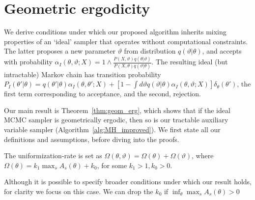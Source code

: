 \vspace{-.1in}
\section{Geometric ergodicity}
\vspace{-.05in}
We derive conditions under which our proposed algorithm
inherits mixing properties of an `ideal' sampler that operates without
computational constraints. The latter proposes a new parameter $\vartheta$
from distribution $q(\vartheta|\theta)$, and accepts with probability
$\alpha_I(\theta,\vartheta; X) = 1 \wedge \frac{P(X , \vartheta)q(\theta| \vartheta)}
{P(X , \theta)q(\vartheta|\theta)}$.  The resulting ideal (but intractable)
Markov chain has transition probability
$P_I(\theta'|\theta) = q(\theta'|\theta)\alpha_I(\theta,\theta';X) + \left[1-\int d\vartheta
q(\vartheta|\theta)\alpha_I(\theta,\vartheta;X)\right]\delta_\theta(\theta')$, the first
term corresponding to acceptance, and the second, rejection.

Our main result is Theorem~\ref{thm:geom_erg}, which shows that if the ideal MCMC
sampler is geometrically ergodic, then so is our tractable auxiliary
variable sampler (Algorithm~\ref{alg:MH_improved}). 
We first state all our definitions and assumptions, before diving into the 
proofs.
\begin{assumption}
The uniformization-rate is set as $\Omega(\theta, \vartheta) = \Omega(\theta) + 
\Omega(\vartheta)$, where %
$\Omega(\theta) = k_1 \max_s A_{s}(\theta) + k_0$, for some 
$k_1 > 1, k_0 > 0$.
\label{asmp:unif_rate}
\end{assumption}
Although it is possible to specify broader conditions under which our 
result holds, for clarity we focus on this case. 
We can drop the $k_0$ if $\inf_\theta \max_s A_s(\theta) > 0$

